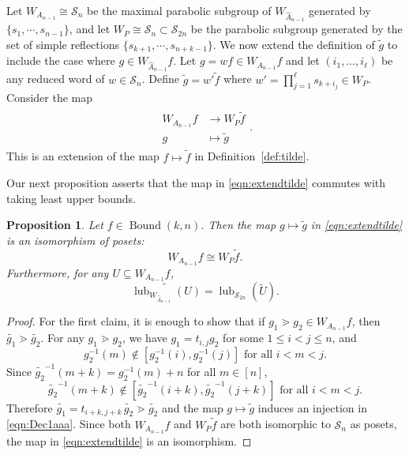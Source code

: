 \documentclass[12pt,reqno]{amsart}
\newtheorem{prop}[lemma]{Proposition}
\theoremstyle{definition}
\newcommand{\symm}{\mathcal{S}}
\newcommand{\bound}{\operatorname{Bound}}
\newcommand{\lub}{\operatorname{lub}}
\begin{document}
{Let $W_{A_{n-1}}\cong \symm_n $ be the maximal parabolic subgroup of $W_{\widehat{A}_{n-1}}$ generated by $\{s_1,\cdots,s_{n-1}\}$, and let $W_{P}\cong \symm_n\subset \symm_{2n}$ be the parabolic subgroup generated by the set of simple reflections $\{s_{k+1},\cdots, s_{n+k-1}\}$. We now extend the definition of $\widetilde{g}$ to include the case where $g\in W_{\widehat{A}_{n-1}}f$.
Let $g = wf\in W_{A_{n-1}}f$ and let $(i_1,\dots,i_\ell)$ be any reduced word of $w\in \symm_n$. Define $\widetilde{g} = w'\widetilde{f}$ where $w' = \prod_{j = 1}^\ell s_{k+i_j}\in W_P$. 
Consider the map 
\begin{align}\label{eqn:extendtilde}
    \begin{split}
        W_{A_{n-1}}f &\longrightarrow W_P\widetilde{f}\\
        g&\mapsto \widetilde{g}
    \end{split}.
\end{align}
This is an extension of the map $f\mapsto \widetilde{f}$ in Definition~\ref{def:tilde}. 

Our next proposition asserts that the map in \eqref{eqn:extendtilde} commutes with taking least upper bounds. 
\begin{prop}
    \label{prop:poset-iso}
     Let $f\in\bound(k,n)$. 
    Then the map $g\mapsto \tilde{g}$ in \eqref{eqn:extendtilde} is an isomorphism of posets:
    \[W_{A_{n-1}}f\cong W_P\widetilde{f}.\]
    Furthermore, for any $U\subseteq W_{A_{n-1}}f$, 
    \begin{equation}\label{eqn:lub}
        \widetilde{\lub_{W_{\widehat{A}_{n-1}}}(U)} = \lub_{\symm_{2n}}(\widetilde{U}).
    \end{equation}
\end{prop}

\begin{proof}
For the first claim, it is enough to show that if $g_1\gtrdot g_2\in W_{A_{n-1}}f$, then $\tilde{g_1}\gtrdot \tilde{g_2}$.
For any $g_1\gtrdot g_2$, we have $g_1 = t_{i,j}g_2$ for some $1\leq i<j\leq n$, and 
\begin{equation}\label{eqn:Dec1aaa}
    g_2^{-1}(m)\notin [g_2^{-1}(i),g_{2}^{-1}(j)]\text{ for all }i<m<j.
\end{equation}
Since $\widetilde{g_2}^{-1}(m+k) = g_2^{-1}(m)+n$ for all $m\in [n]$, 
\[\widetilde{g_2}^{-1}(m+k)\notin [\widetilde{g_2}^{-1}(i+k),\widetilde{g_{2}}^{-1}(j+k)]\text{ for all }i<m<j.\] 
Therefore $\widetilde{g_1} = t_{i+k,j+k}\, \widetilde{g_2}\gtrdot \widetilde{g_2}$ and the map $g\mapsto \widetilde{g}$ induces an injection in \eqref{eqn:Dec1aaa}. Since both $W_{A_{n-1}}f$ and $W_P\widetilde{f}$ are both isomorphic to $\symm_n$ as posets, the map in \eqref{eqn:extendtilde} is an isomorphism.


\end{proof}}
\end{document}
